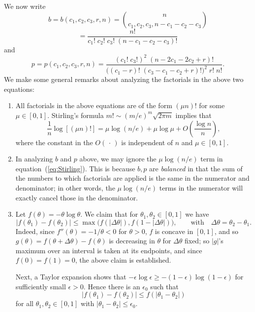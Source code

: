 \documentclass[12pt]{article}
\begin{document}
We now write
\begin{equation}\label{eq:b_factorials}
b=b(c_1,c_2,c_3,r,n) = \binom{n}{c_1,c_2,c_3,n-c_1-c_2-c_3}
\end{equation}
$$
= \frac{n!}{c_1!\;c_2!\;c_3!\;(n-c_1-c_2-c_3)!}
$$
and 
\begin{equation}\label{eq:p_factorials}
p=p(c_1,c_2,c_3,r,n) = \frac{(c_1!\;c_3!)^2\;(n-2c_1-2c_2+r)!}{
\bigl( (c_1-r)!\;(c_3-c_1-c_2+r)!\bigr)^2\; r!\;n!}.
\end{equation}
We make some general remarks about analyzing the factorials in the
above two equations:
\begin{enumerate}
\item All factorials in the above equations are of the form $(\mu n)!$
for some $\mu\in[0,1]$.  Stirling's formula $m!\sim (m/e)^m\sqrt{2\pi m}$
implies that
\begin{equation}\label{eq:Stirling}
\frac{1}{n}\log[ (\mu n)! ] = \mu\log(n/e) + \mu\log\mu + O\left(\frac{\log n}{
n}\right),
\end{equation}
where the constant in the $O(\,\cdot\,)$ is independent of $n$ and 
$\mu\in[0,1]$.
\item In analyzing $b$ and $p$ above, we may ignore the $\mu\log(n/e)$ term
in equation~(\ref{eq:Stirling}).  This is because $b,p$ are {\em balanced}
in that the sum of the numbers to which factorials are applied is the same
in the numerator and denominator; in other words, the $\mu\log(n/e)$ terms
in the numerator will exactly cancel those in the denominator.
\item Let $f(\theta)=-\theta\log\theta$.
We claim that for $\theta_1,\theta_2\in[0,1]$ we have
$$
|f(\theta_1)-f(\theta_2)| \le \max\bigl( f(|\Delta\theta|),f(1-|\Delta\theta|)
\bigr),\qquad\mbox{with}\quad \Delta\theta=\theta_2-\theta_1.
$$
Indeed, since $f''(\theta)=-1/\theta<0$ for $\theta>0$, $f$ is concave
in $[0,1]$, and so $g(\theta)=f(\theta+\Delta\theta)-f(\theta)$ is decreasing
in $\theta$ for $\Delta\theta$ fixed; so $|g|$'s maximum over an interval is
taken at its endpoints, and since $f(0)=f(1)=0$, the above claim is 
established.

Next, a Taylor expansion shows that $-\epsilon\log\epsilon\ge
-(1-\epsilon)\log(1-\epsilon)$ for sufficiently small $\epsilon>0$.  Hence
there is an $\epsilon_0$ such that 
\begin{equation}\label{eq:difference}
|f(\theta_1)-f(\theta_2)| \le f(|\theta_1-\theta_2|)
\end{equation}
for all $\theta_1,\theta_2\in[0,1]$ with $|\theta_1-\theta_2|\le \epsilon_0$.
\end{enumerate}
\end{document}
